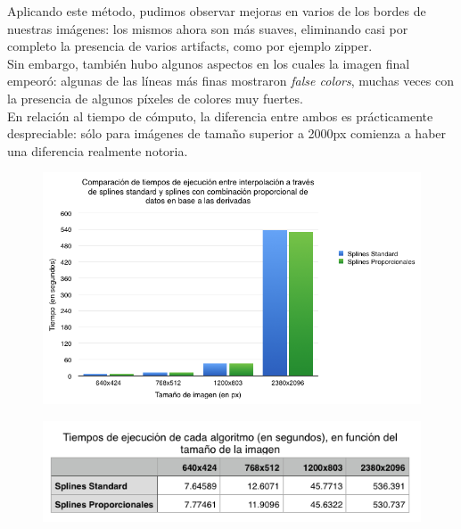 \documentclass[a4paper]{article}
\begin{document}
\bigskip

Aplicando este método, pudimos observar mejoras en varios de los bordes de nuestras imágenes: los mismos ahora son más suaves, eliminando casi por completo la presencia de varios artifacts, como por ejemplo zipper.\\
\indent Sin embargo, también hubo algunos aspectos en los cuales la imagen final empeoró: algunas de las líneas más finas mostraron \textit{false colors}, muchas veces con la presencia de algunos píxeles de colores muy fuertes.\\

En relación al tiempo de cómputo, la diferencia entre ambos es prácticamente despreciable: sólo para imágenes de tamaño superior a 2000px comienza a haber una diferencia realmente notoria.

\begin{figure}[h!]
\begin{center}
    \includegraphics[scale=0.65]{imagenes/tiempos/stdpropg.png}
    \label{tiemposrang}
  \end{center}
\end{figure}
\pagebreak
\begin{figure}[h!]
    \begin{center}
    \includegraphics[scale=0.70]{imagenes/tiempos/stdpropt.png}
    \label{tiempos1}
  \end{center}
\end{figure}
\end{document}
